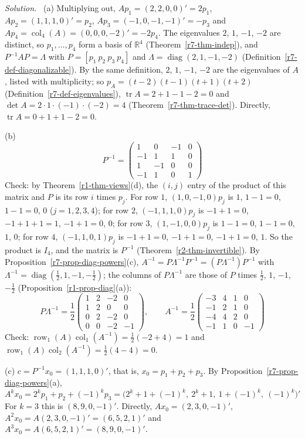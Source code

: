 \documentclass[12pt]{article}
\newcommand{\R}{\mathbb R}
\DeclareMathOperator{\tr}{tr}
\DeclareMathOperator{\row}{row}
\DeclareMathOperator{\col}{col}
\DeclareMathOperator{\diag}{diag}
\theoremstyle{definition}
\newenvironment{solution}{\par\noindent\textit{Solution.}\ }{\par\smallskip}
\begin{document}
\begin{solution}
(a) Multiplying out, \(Ap_1=(2,2,0,0)'=2p_1\), \(Ap_2=(1,1,1,0)'=p_2\), \(Ap_3=(-1,0,-1,-1)'=-p_3\) and
\(Ap_4=\col_4(A)=(0,0,0,-2)'=-2p_4\). The eigenvalues \(2\), \(1\), \(-1\), \(-2\) are distinct, so \(p_1,\dots,p_4\)
form a basis of \(\R^4\) (Theorem~\ref{r7-thm-indep}), and \(P^{-1}AP=\Lambda\) with \(P=[p_1\ p_2\ p_3\ p_4]\) and
\(\Lambda=\diag(2,1,-1,-2)\) (Definition~\ref{r7-def-diagonalizable}). By the same definition, \(2\), \(1\), \(-1\), \(-2\)
are the eigenvalues of \(A\), listed with multiplicity; so \(p_A=(t-2)(t-1)(t+1)(t+2)\)
(Definition~\ref{r7-def-eigenvalues}), \(\tr A=2+1-1-2=0\) and \(\det A=2\cdot1\cdot(-1)\cdot(-2)=4\)
(Theorem~\ref{r7-thm-trace-det}). Directly, \(\tr A=0+1+1-2=0\).

(b)
\[
P^{-1}=\begin{pmatrix}1&0&-1&0\\-1&1&1&0\\1&-1&0&0\\-1&1&0&1\end{pmatrix}
\]
Check: by Theorem~\ref{r1-thm-views}(d), the \((i,j)\) entry of the product of this matrix and \(P\) is its row \(i\) times
\(p_j\). For row \(1\), \((1,0,-1,0)p_j\) is \(1\), \(1-1=0\), \(1-1=0\), \(0\) (\(j=1,2,3,4\)); for row \(2\),
\((-1,1,1,0)p_j\) is \(-1+1=0\), \(-1+1+1=1\), \(-1+1=0\), \(0\); for row \(3\), \((1,-1,0,0)p_j\) is \(1-1=0\),
\(1-1=0\), \(1\), \(0\); for row \(4\), \((-1,1,0,1)p_j\) is \(-1+1=0\), \(-1+1=0\), \(-1+1=0\), \(1\). So the product
is \(I_4\), and the matrix is \(P^{-1}\) (Theorem~\ref{r2-thm-invertible}). By
Proposition~\ref{r7-prop-diag-powers}(c), \(A^{-1}=P\Lambda^{-1}P^{-1}=(P\Lambda^{-1})P^{-1}\) with
\(\Lambda^{-1}=\diag(\frac12,1,-1,-\frac12)\); the columns of \(P\Lambda^{-1}\) are those of \(P\) times \(\frac12\), \(1\), \(-1\),
\(-\frac12\) (Proposition~\ref{r1-prop-diag}(a)):
\[
P\Lambda^{-1}=\frac12\begin{pmatrix}1&2&-2&0\\1&2&0&0\\0&2&-2&0\\0&0&-2&-1\end{pmatrix},\qquad
A^{-1}=\frac12\begin{pmatrix}-3&4&1&0\\-1&2&1&0\\-4&4&2&0\\-1&1&0&-1\end{pmatrix}
\]
Check: \(\row_1(A)\col_1(A^{-1})=\frac12(-2+4)=1\) and \(\row_1(A)\col_2(A^{-1})=\frac12(4-4)=0\).

(c) \(c=P^{-1}x_0=(1,1,1,0)'\), that is, \(x_0=p_1+p_2+p_3\). By Proposition~\ref{r7-prop-diag-powers}(a),
\[
A^kx_0=2^kp_1+p_2+(-1)^kp_3=\bigl(2^k+1+(-1)^k,\ 2^k+1,\ 1+(-1)^k,\ (-1)^k\bigr)'
\]
For \(k=3\) this is \((8,9,0,-1)'\). Directly, \(Ax_0=(2,3,0,-1)'\), \(A^2x_0=A(2,3,0,-1)'=(6,5,2,1)'\) and
\(A^3x_0=A(6,5,2,1)'=(8,9,0,-1)'\).
\end{solution}
\end{document}
